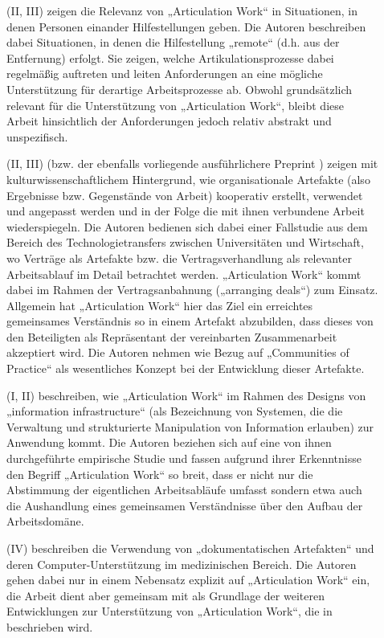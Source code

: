 \begin{description}
	\item[\citet{Crabtree06}] (II, III) zeigen die Relevanz von „Articulation Work“ in Situationen, in denen Personen einander Hilfestellungen geben. Die Autoren beschreiben dabei Situationen, in denen die Hilfestellung „remote“ (d.h. aus der Entfernung) erfolgt. Sie zeigen, welche Artikulationsprozesse dabei regelmäßig auftreten und leiten Anforderungen an eine mögliche Unterstützung für derartige Arbeitsprozesse ab. Obwohl grundsätzlich relevant für die Unterstützung von „Articulation Work“, bleibt diese Arbeit hinsichtlich der Anforderungen jedoch relativ abstrakt und unspezifisch. 
	\item[\citet{Kaghan06}] (II, III) (bzw. der ebenfalls vorliegende ausführlichere Preprint \citet{Kaghan04}) zeigen mit kulturwissenschaftlichem Hintergrund, wie organisationale Artefakte (also Ergebnisse bzw. Gegenstände von Arbeit) kooperativ erstellt, verwendet und angepasst werden und in der Folge die mit ihnen verbundene Arbeit wiederspiegeln. Die Autoren bedienen sich dabei einer Fallstudie aus dem Bereich des Technologietransfers zwischen Universitäten und Wirtschaft, wo Verträge als Artefakte bzw. die Vertragsverhandlung als relevanter Arbeitsablauf im Detail betrachtet werden. „Articulation Work“ kommt dabei im Rahmen der Vertragsanbahnung („arranging deals“) zum Einsatz. Allgemein hat „Articulation Work“ hier das Ziel ein erreichtes gemeinsames Verständnis so in einem Artefakt abzubilden, dass dieses von den Beteiligten als Repräsentant der vereinbarten Zusammenarbeit akzeptiert wird. Die Autoren nehmen wie \citet{Davenport02} Bezug auf „Communities of Practice“ als wesentliches Konzept bei der Entwicklung dieser Artefakte.
	\item[\citet{Baker07}] (I, II) beschreiben, wie „Articulation Work“ im Rahmen des Designs von „information infrastructure“ (als Bezeichnung von Systemen, die die Verwaltung und strukturierte Manipulation von Information erlauben) zur Anwendung kommt. Die Autoren beziehen sich auf eine von ihnen durchgeführte empirische Studie und fassen aufgrund ihrer Erkenntnisse den Begriff „Articulation Work“ so breit, dass er nicht nur die Abstimmung der eigentlichen Arbeitsabläufe umfasst sondern etwa auch die Aushandlung eines gemeinsamen Verständnisse über den Aufbau der Arbeitsdomäne. 
	\item[\citet{Cabitza07}] (IV) beschreiben die Verwendung von „dokumentatischen Artefakten“ und deren Computer-Unterstützung im medizinischen Bereich. Die Autoren gehen dabei nur in einem Nebensatz explizit auf „Articulation Work“ ein, die Arbeit dient aber gemeinsam mit \citet{Cabitza06} als Grundlage der weiteren Entwicklungen zur Unterstützung von „Articulation Work“, die in \citep{Cabitza09} beschrieben wird.

\end{description}
